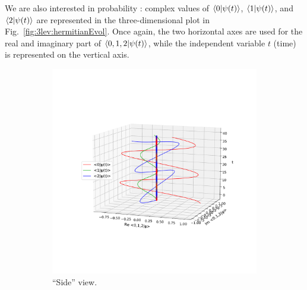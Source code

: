 We are also interested in probability :
complex values of
$\braket{0}{\psi(t)}$,
$\braket{1}{\psi(t)}$, and
$\braket{2}{\psi(t)}$
are represented in the three-dimensional
plot in Fig.~\ref{fig:3lev:hermitianEvol}.
Once again, the two horizontal axes are used for the real and imaginary part of
$\braket{0, 1, 2}{\psi(t)}$,
while the independent variable $t$ (time) is represented on the vertical axis.
\begin{figure}[]
  \begin{subfigure}[t]{\textwidth}
    \centering
    \includegraphics[height=0.45\textheight,clip,trim=80 180 40 140]{img/3ldetect/hermitianSpaceTime_side.pdf}
    \caption{``Side'' view.}
  \end{subfigure}
  \par\bigskip
  \begin{subfigure}[b]{\textwidth}
    \centering

\end{subfigure}
\end{figure}
